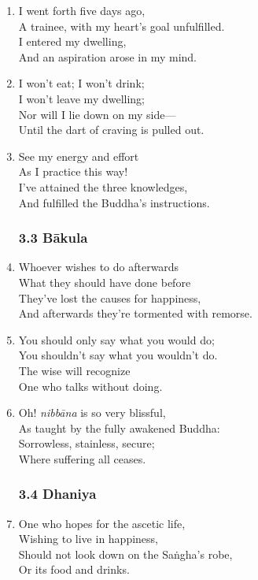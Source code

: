 \documentclass[10pt, openany]{book}
\begin{document}
\begin{enumerate}
\item I went forth five days ago,\\
A trainee, with my heart’s goal unfulfilled.\\
I entered my dwelling,\\
And an aspiration arose in my mind.

\item I won’t eat; I won’t drink;\\
I won’t leave my dwelling;\\
Nor will I lie down on my side—\\
Until the dart of craving is pulled out.

\item See my energy and effort\\
As I practice this way!\\
I’ve attained the three knowledges,\\
And fulfilled the Buddha’s instructions.

\subsubsection*{3.3 Bākula}

\item Whoever wishes to do afterwards\\
What they should have done before\\
They’ve lost the causes for happiness,\\
And afterwards they’re tormented with remorse.

\item You should only say what you would do;\\
You shouldn’t say what you wouldn’t do.\\
The wise will recognize\\
One who talks without doing.

\item Oh! \emph{nibbāna} is so very blissful,\\
As taught by the fully awakened Buddha:\\
Sorrowless, stainless, secure;\\
Where suffering all ceases.

\subsubsection*{3.4 Dhaniya}

\item One who hopes for the ascetic life,\\
Wishing to live in happiness,\\
Should not look down on the Saṅgha’s robe,\\
Or its food and drinks.


\end{enumerate}
\end{document}
